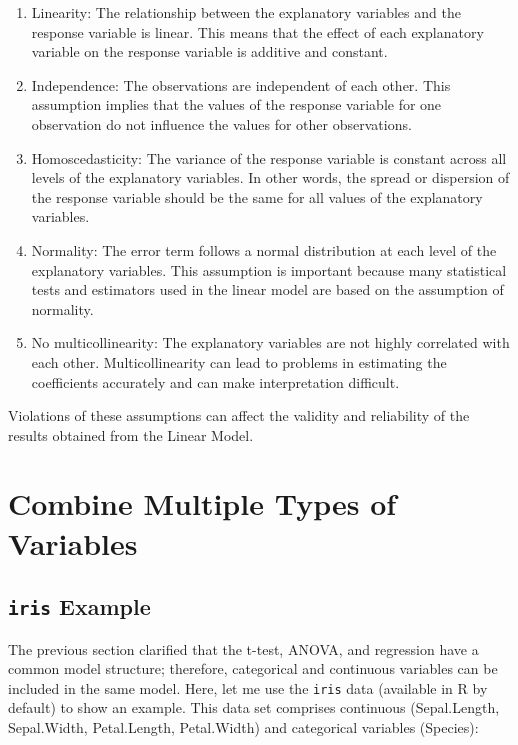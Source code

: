 \documentclass[
]{book}
\begin{document}
\begin{enumerate}
\def\labelenumi{\arabic{enumi}.}
\item
  Linearity: The relationship between the explanatory variables and the response variable is linear. This means that the effect of each explanatory variable on the response variable is additive and constant.
\item
  Independence: The observations are independent of each other. This assumption implies that the values of the response variable for one observation do not influence the values for other observations.
\item
  Homoscedasticity: The variance of the response variable is constant across all levels of the explanatory variables. In other words, the spread or dispersion of the response variable should be the same for all values of the explanatory variables.
\item
  Normality: The error term follows a normal distribution at each level of the explanatory variables. This assumption is important because many statistical tests and estimators used in the linear model are based on the assumption of normality.
\item
  No multicollinearity: The explanatory variables are not highly correlated with each other. Multicollinearity can lead to problems in estimating the coefficients accurately and can make interpretation difficult.
\end{enumerate}

Violations of these assumptions can affect the validity and reliability of the results obtained from the Linear Model.

\hypertarget{combine-multiple-types-of-variables}{%
\section{Combine Multiple Types of Variables}\label{combine-multiple-types-of-variables}}

\hypertarget{iris-example}{%
\subsection{\texorpdfstring{\texttt{iris} Example}{iris Example}}\label{iris-example}}

The previous section clarified that the t-test, ANOVA, and regression have a common model structure; therefore, categorical and continuous variables can be included in the same model. Here, let me use the \texttt{iris} data (available in R by default) to show an example. This data set comprises continuous (Sepal.Length, Sepal.Width, Petal.Length, Petal.Width) and categorical variables (Species):
\end{document}

